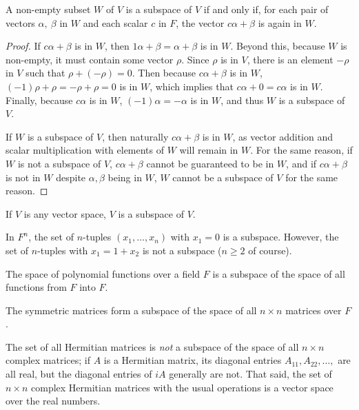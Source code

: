 \documentclass[12pt]{article}
\begin{document}
\begin{thm} \label{thm:subspcaplb}
  A non-empty subset $W$ of $V$ is a subspace of $V$ if and only if, for each pair of
  vectors $\alpha,\ \beta$ in $W$ and each scalar $c$ in $F$, the vector $c\alpha +
  \beta$ is again in $W$.

  \begin{proof}
    If $c\alpha + \beta$ is in $W$, then $1\alpha + \beta = \alpha + \beta$ is in
    $W$. Beyond this, because $W$ is non-empty, it must contain some vector $\rho$.
    Since $\rho$ is in $V$, there is an element $-\rho$ in $V$ such that $\rho +
    (-\rho) = 0$. Then because $c\alpha + \beta$ is in $W$, $(-1)\rho + \rho = -\rho
    + \rho = 0$ is in $W$, which implies that $c\alpha + 0 = c\alpha$ is in $W$.
    Finally, because $c\alpha$ is in $W$, $(-1)\alpha = -\alpha$ is in $W$, and thus
    $W$ is a subspace of $V$.

    If $W$ is a subspace of $V$, then naturally $c\alpha + \beta$ is in $W$, as
    vector addition and scalar multiplication with elements of $W$ will remain in
    $W$. For the same reason, if $W$ is not a subspace of $V$, $c\alpha + \beta$
    cannot be guaranteed to be in $W$, and if $c\alpha + \beta$ is not in $W$ despite
    $\alpha,\beta$ being in $W$, $W$ cannot be a subspace of $V$ for the same reason.
  \end{proof}
\end{thm}

\begin{exm}
  If $V$ is any vector space, $V$ is a subspace of $V$.
\end{exm}

\begin{exm}
  In $F^{n}$, the set of $n$-tuples $(x_1,\ldots,x_n)$ with $x_1 = 0$ is a subspace.
  However, the set of $n$-tuples with $x_1 = 1 + x_2$ is not a subspace ($n \geq 2$
  of course).
\end{exm}

\begin{exm}
  The space of polynomial functions over a field $F$ is a subspace of the space of
  all functions from $F$ into $F$.
\end{exm}

\begin{exm}
  The symmetric matrices form a subspace of the space of all $n \times n$ matrices
  over $F$.
\end{exm}

\begin{exm}
  The set of all Hermitian matrices is \textit{not} a subspace of the space of all $n
  \times n$ complex matrices; if $A$ is a Hermitian matrix, its diagonal entries
  $A_{11},A_{22},\ldots,$ are all real, but the diagonal entries of $iA$ generally
  are not. That said, the set of $n \times n$ complex Hermitian matrices with the
  usual operations is a vector space over the real numbers.
\end{exm}
\end{document}
